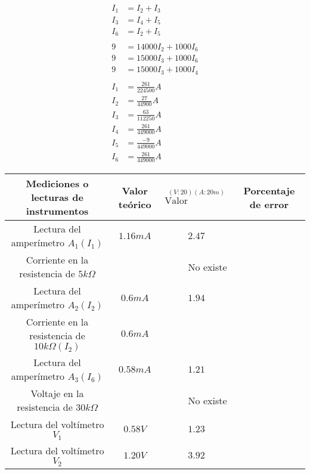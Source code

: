 \documentclass{article}
\begin{document}
\begin{align*}
	I_1 &= I_2 + I_3\\
	I_3 &= I_4 + I_5\\
	I_6 &= I_2 + I_5\\
	\\
	9 &= 14000I_2 + 1000I_6\\
	9 &= 15000I_3 + 1000I_6\\
	9 &= 15000I_3 + 1000I_4\\
	\\
	I_1 &= \frac{261}{224500}A\\
	I_2 &= \frac{27}{44900}A\\
	I_3 &= \frac{63}{112250}A\\
	I_4 &= \frac{261}{449000}A\\
	I_5 &= \frac{-9}{449000}A\\
	I_6 &= \frac{261}{449000}A
\end{align*}

\begin{table}[H]
	\centering
	\begin{tabular}{|c|c|c|c|}
		\hline
		Mediciones o lecturas de instrumentos & Valor teórico &
		\(
			\overset
			{
				(V:20)(A:20m)
			}
			{
				\text{Valor expermiental}
			}
		\)
		& Porcentaje de error\\
		\hline
		Lectura del amperímetro $A_1(I_1)$ &
		$1.16mA$ & $2.47$
		\\
		\hline
		Corriente en la resistencia de $5k\Omega$ &
		\multicolumn{3}{c|}{No existe}\\
		\hline
		Lectura del amperímetro $A_2(I_2)$ &
		$0.6mA$ & $1.94$\\
		\hline
		Corriente en la resistencia de $10k\Omega(I_2)$ &
		$0.6mA$\\
		\hline
		Lectura del amperímetro $A_3(I_6)$ &
		$0.58mA$ & $1.21$\\
		\hline
		Voltaje en la resistencia de $30k\Omega$ &
		\multicolumn{3}{c|}{No existe}\\
		\hline
		Lectura del voltímetro $V_1$ &
		$0.58V$ & $1.23$\\
		\hline
		Lectura del voltímetro $V_2$ &
		$1.20V$ & $3.92$\\
		\hline
	\end{tabular}
\end{table}
\end{document}

